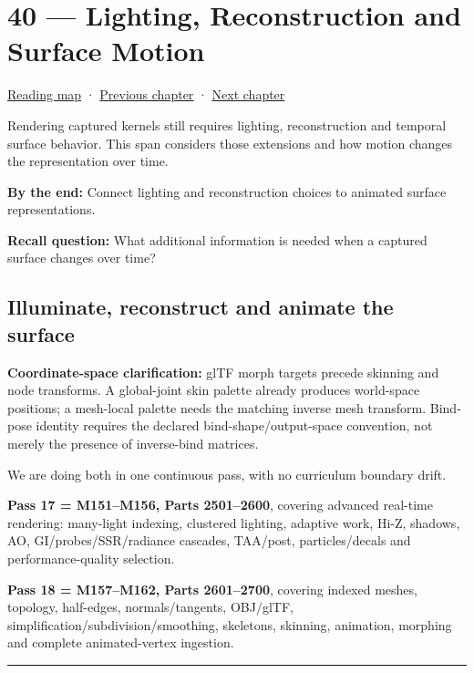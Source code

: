 \hypertarget{04-visual-computing-ii-ch040}{}
\chapter{40 --- Lighting, Reconstruction and Surface Motion}\label{04-visual-computing-ii-ch040-lighting-reconstruction-and-surface-motion}

\hyperref[volume-reading-map]{Reading map} · \hyperref[04-visual-computing-ii-ch039]{Previous chapter} · \hyperref[04-visual-computing-ii-ch041]{Next chapter}

Rendering captured kernels still requires lighting, reconstruction and temporal surface behavior. This span considers those extensions and how motion changes the representation over time.

\textbf{By the end:} Connect lighting and reconstruction choices to animated surface representations.

\textbf{Recall question:} What additional information is needed when a captured surface changes over time?

\section{Illuminate, reconstruct and animate the surface}\label{04-visual-computing-ii-ch040-illuminate-reconstruct-and-animate-the-surface}

\textbf{Coordinate-space clarification:} glTF morph targets precede skinning and node transforms. A global-joint skin palette already produces world-space positions; a mesh-local palette needs the matching inverse mesh transform. Bind-pose identity requires the declared bind-shape/output-space convention, not merely the presence of inverse-bind matrices.

We are doing both in one continuous pass, with no curriculum boundary drift.

\textbf{Pass 17 = M151--M156, Parts 2501--2600}, covering advanced real-time rendering: many-light indexing, clustered lighting, adaptive work, Hi-Z, shadows, AO, GI/probes/SSR/radiance cascades, TAA/post, particles/decals and performance-quality selection.

\textbf{Pass 18 = M157--M162, Parts 2601--2700}, covering indexed meshes, topology, half-edges, normals/tangents, OBJ/glTF, simplification/subdivision/smoothing, skeletons, skinning, animation, morphing and complete animated-vertex ingestion.

\begin{center}\rule{0.5\linewidth}{0.5pt}\end{center}

